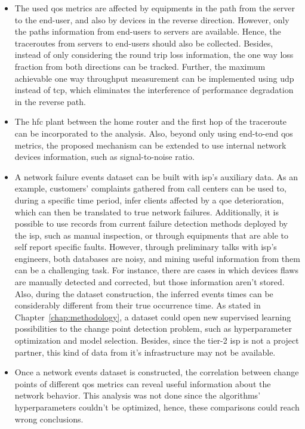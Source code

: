 \begin{itemize}
\item
The used \gls*{qos} metrics are affected by equipments in the path from the server to
the end-user, and also by devices in the reverse direction.
However, only the paths information from end-users to servers are available.
Hence, the traceroutes from servers to end-users should also be collected.
Besides, instead of only considering the round trip loss information,
the one way loss fraction from both directions can be tracked.
Further, the maximum achievable one way throughput measurement can be
implemented using \gls*{udp} instead of \gls*{tcp}, which eliminates the interference of
performance degradation in the reverse path.

\item
The \gls*{hfc} plant between the home router and the
first hop of the traceroute can be incorporated to the analysis.
Also, beyond only using end-to-end \gls*{qos} metrics,
the proposed mechanism can be extended
to use internal network devices information, such as signal-to-noise ratio.

\item
A network failure events dataset can be built with \gls*{isp}'s auxiliary data.
As an example, customers' complaints gathered from call centers can be used to,
during a specific time period, infer clients affected by a \gls*{qoe} deterioration,
which can then be translated to true network failures.
Additionally, it is possible to use records from current failure detection
methods deployed by the \gls*{isp}, such as manual inspection, or through equipments
that are able to self report specific faults.
However, through preliminary talks with \gls*{isp}'s engineers,
both databases are noisy, and mining useful information
from them can be a challenging task.
For instance, there are cases in which devices flaws are manually
detected and corrected, but those information aren't stored.
Also, during the dataset construction, the inferred events times can be
considerably different from their true occurrence time.
As stated in Chapter~\ref{chap:methodology}, a dataset could open new
supervised learning possibilities to the change point detection problem, such
as hyperparameter optimization and model selection.
Besides, since the tier-2 \gls*{isp} is not a project partner, this kind of data from
it's infrastructure may not be available.

\item
Once a network events dataset is constructed, the correlation between
change points of different \gls*{qos} metrics can reveal useful information
about the network behavior. This analysis was not done since the algorithms'
hyperparameters couldn't be optimized, hence, these comparisons could reach
wrong conclusions.


\end{itemize}
